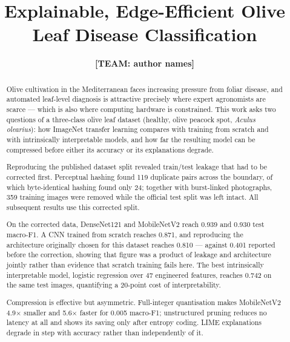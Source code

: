 \documentclass[sigconf,nonacm]{acmart}
\newcommand{\NEEDSTEAM}[1]{\textbf{[TEAM: #1]}}
\begin{document}
\title{Explainable, Edge-Efficient Olive Leaf Disease Classification}

\author{\NEEDSTEAM{author names}}

\begin{abstract}
Olive cultivation in the Mediterranean faces increasing pressure from foliar
disease, and automated leaf-level diagnosis is attractive precisely where expert
agronomists are scarce --- which is also where computing hardware is
constrained. This work asks two questions of a three-class olive leaf dataset
(healthy, olive peacock spot, \emph{Aculus olearius}): how ImageNet transfer
learning compares with training from scratch and with intrinsically interpretable
models, and how far the resulting model can be compressed before either its
accuracy or its explanations degrade.

Reproducing the published dataset split revealed train/test leakage that had to
be corrected first. Perceptual hashing found 119 duplicate pairs across the
boundary, of which byte-identical hashing found only 24; together with
burst-linked photographs, 359 training images were removed while the official
test split was left intact. All subsequent results use this corrected split.

On the corrected data, DenseNet121 and MobileNetV2 reach 0.939 and 0.930 test
macro-F1. A CNN trained from scratch reaches 0.871, and reproducing the
architecture originally chosen for this dataset reaches 0.810 --- against 0.401
reported before the correction, showing that figure was a product of leakage and
architecture jointly rather than evidence that scratch training fails here. The
best intrinsically interpretable model, logistic regression over 47 engineered
features, reaches 0.742 on the same test images, quantifying a 20-point cost of
interpretability.

Compression is effective but asymmetric. Full-integer quantisation makes
MobileNetV2 4.9$\times$ smaller and 5.6$\times$ faster for 0.005 macro-F1;
unstructured pruning reduces no latency at all and shows its saving only after
entropy coding. LIME explanations degrade in step with accuracy rather than
independently of it.
\end{abstract}
\end{document}
